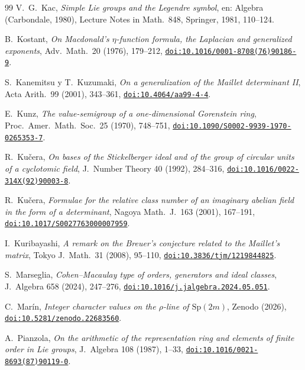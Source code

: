 \documentclass[11pt,a4paper]{article}
\theoremstyle{definition}
\newcommand{\Sp}{\mathrm{Sp}}
\begin{document}
\begin{thebibliography}{99}
 V.~G.~Kac, \emph{Simple Lie groups and the Legendre symbol}, en: Algebra (Carbondale, 1980), Lecture
Notes in Math.~848, Springer, 1981, 110--124.

 B.~Kostant, \emph{On Macdonald's $\eta$-function formula, the Laplacian and generalized exponents}, Adv.~Math.~20 (1976), 179--212, \href{https://doi.org/10.1016/0001-8708(76)90186-9}{\texttt{doi:10.1016/0001-8708(76)90186-9}}.

 S.~Kanemitsu y T.~Kuzumaki, \emph{On a generalization of the Maillet determinant II}, Acta Arith.~99 (2001), 343--361, \href{https://doi.org/10.4064/aa99-4-4}{\texttt{doi:10.4064/aa99-4-4}}.

 E.~Kunz, \emph{The value-semigroup of a one-dimensional Gorenstein ring}, Proc.~Amer.~Math.~Soc.~25 (1970), 748--751, \href{https://doi.org/10.1090/S0002-9939-1970-0265353-7}{\texttt{doi:10.1090/S0002-9939-1970-0265353-7}}.

 R.~Ku\v{c}era, \emph{On bases of the Stickelberger ideal and of the group of circular units of a
cyclotomic field}, J.~Number Theory 40 (1992), 284--316, \href{https://doi.org/10.1016/0022-314X(92)90003-8}{\texttt{doi:10.1016/0022-314X(92)90003-8}}.

 R.~Ku\v{c}era, \emph{Formulae for the relative class number of an imaginary abelian field in the form of a determinant}, Nagoya Math.~J.~163 (2001), 167--191, \href{https://doi.org/10.1017/S0027763000007959}{\texttt{doi:10.1017/S0027763000007959}}.

 I.~Kuribayashi, \emph{A remark on the Breuer's conjecture related to the Maillet's matrix}, Tokyo J.~Math.~31 (2008), 95--110, \href{https://doi.org/10.3836/tjm/1219844825}{\texttt{doi:10.3836/tjm/1219844825}}.

 S.~Marseglia, \emph{Cohen--Macaulay type of orders, generators and ideal classes}, J.~Algebra 658 (2024), 247--276, \href{https://doi.org/10.1016/j.jalgebra.2024.05.051}{\texttt{doi:10.1016/j.jalgebra.2024.05.051}}.

 C.~Mar\'in, \emph{Integer character values on the $\rho$-line of $\Sp(2m)$}, Zenodo (2026), \href{https://doi.org/10.5281/zenodo.22683560}{\texttt{doi:10.5281/zenodo.22683560}}.

 A.~Pianzola, \emph{On the arithmetic of the representation ring and elements of finite order in Lie
groups}, J.~Algebra 108 (1987), 1--33, \href{https://doi.org/10.1016/0021-8693(87)90119-0}{\texttt{doi:10.1016/0021-8693(87)90119-0}}.


\end{thebibliography}
\end{document}
